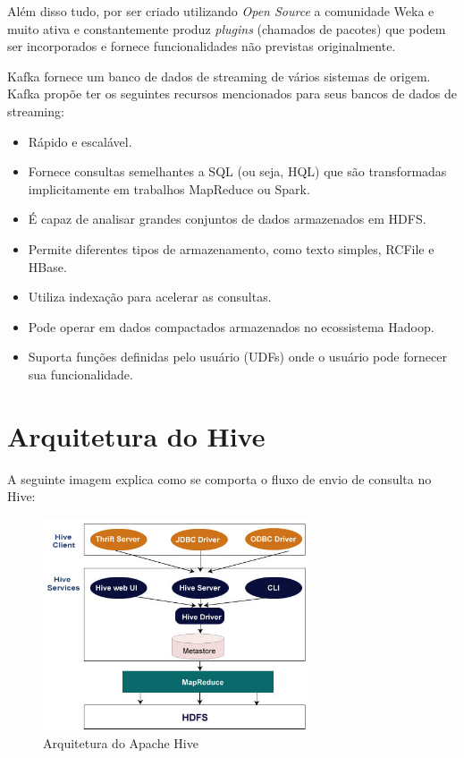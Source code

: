 \documentclass[a4paper,11pt]{article}
\begin{document}
Além disso tudo, por ser criado utilizando \textit{Open Source} a comunidade Weka e muito ativa e constantemente produz \textit{plugins} (chamados de pacotes) que podem ser incorporados e fornece funcionalidades não previstas originalmente.

Kafka fornece um banco de dados de streaming de vários sistemas de origem. Kafka propõe ter os seguintes recursos mencionados para seus bancos de dados de streaming: \vspace{-1em}
\begin{itemize}
	\item Rápido e escalável.
	\item Fornece consultas semelhantes a SQL (ou seja, HQL) que são transformadas implicitamente em trabalhos MapReduce ou Spark.
	\item É capaz de analisar grandes conjuntos de dados armazenados em HDFS.
	\item Permite diferentes tipos de armazenamento, como texto simples, RCFile e HBase.
	\item Utiliza indexação para acelerar as consultas.
	\item Pode operar em dados compactados armazenados no ecossistema Hadoop.
	\item Suporta funções definidas pelo usuário (UDFs) onde o usuário pode fornecer sua funcionalidade. 
\end{itemize}

\section{Arquitetura do Hive}
A seguinte imagem explica como se comporta o fluxo de envio de consulta no Hive:
\begin{figure}[H]
	\centering
	\includegraphics[width=0.7\textwidth]{imagem/architecture.jpg}
	\caption{Arquitetura do Apache Hive}
\end{figure}
\end{document}
